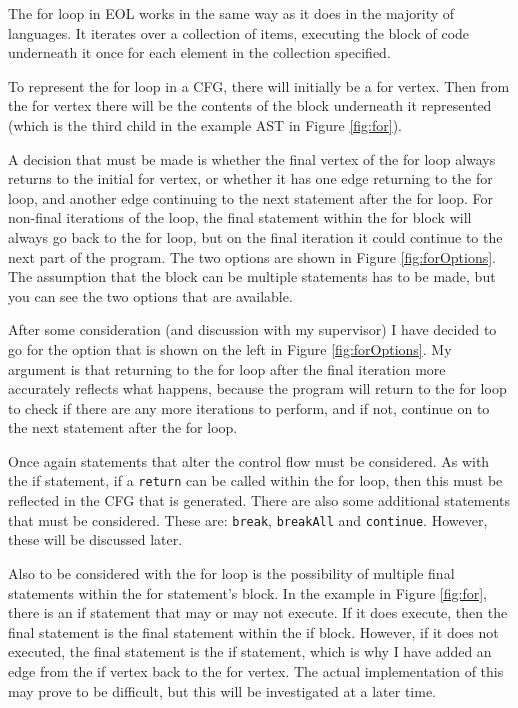 The for loop in EOL works in the same way as it does in the majority of languages. It iterates over a collection of items, executing the block of code underneath it once for each element in the collection specified.

To represent the for loop in a CFG, there will initially be a for vertex. Then from the for vertex there will be the contents of the block underneath it represented (which is the third child in the example AST in Figure \ref{fig:for}).

A decision that must be made is whether the final vertex of the for loop always returns to the initial for vertex, or whether it has one edge returning to the for loop, and another edge continuing to the next statement after the for loop. For non-final iterations of the loop, the final statement within the for block will always go back to the for loop, but on the final iteration it could continue to the next part of the program. The two options are shown in Figure \ref{fig:forOptions}. The assumption that the block can be multiple statements has to be made, but you can see the two options that are available.

After some consideration (and discussion with my supervisor) I have decided to go for the option that is shown on the left in Figure \ref{fig:forOptions}. My argument is that returning to the for loop after the final iteration more accurately reflects what happens, because the program will return to the for loop to check if there are any more iterations to perform, and if not, continue on to the next statement after the for loop.

Once again statements that alter the control flow must be considered. As with the if statement, if a \verb|return| can be called within the for loop, then this must be reflected in the CFG that is generated. There are also some additional statements that must be considered. These are: \verb|break|, \verb|breakAll| and \verb|continue|. However, these will be discussed later.

Also to be considered with the for loop is the possibility of multiple final statements within the for statement's block. In the example in Figure \ref{fig:for}, there is an if statement that may or may not execute. If it does execute, then the final statement is the final statement within the if block. However, if it does not executed, the final statement is the if statement, which is why I have added an edge from the if vertex back to the for vertex. The actual implementation of this may prove to be difficult, but this will be investigated at a later time.

